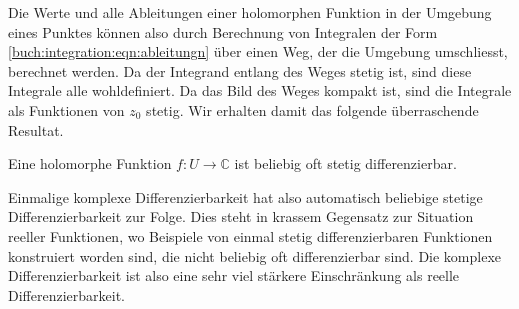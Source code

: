 Die Werte und alle Ableitungen einer holomorphen Funktion in der Umgebung
eines Punktes können also durch Berechnung von Integralen der Form
\eqref{buch:integration:eqn:ableitungn}
über einen Weg, der die Umgebung umschliesst, berechnet werden.
Da der Integrand entlang des Weges stetig ist, sind diese Integrale
alle wohldefiniert.
Da das Bild des Weges kompakt ist, sind die Integrale als Funktionen
von $z_0$ stetig.
Wir erhalten damit das folgende überraschende Resultat.

\begin{korollar}
Eine holomorphe Funktion $f\colon U\to\mathbb{C}$ ist beliebig oft stetig
differenzierbar.
\end{korollar}

Einmalige komplexe Differenzierbarkeit hat also automatisch beliebige
stetige Differenzierbarkeit zur Folge.
Dies steht in krassem Gegensatz zur Situation reeller Funktionen,
wo Beispiele von einmal stetig differenzierbaren Funktionen konstruiert
worden sind, die nicht beliebig oft differenzierbar sind.
Die komplexe Differenzierbarkeit ist also eine sehr viel stärkere
Einschränkung als reelle Differenzierbarkeit.

